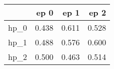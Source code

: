 \begin{tabular}{lrrr}
\toprule
{} &   ep 0 &   ep 1 &   ep 2 \\
\midrule
hp\_0 &  0.438 &  0.611 &  0.528 \\
hp\_1 &  0.488 &  0.576 &  0.600 \\
hp\_2 &  0.500 &  0.463 &  0.514 \\
\bottomrule
\end{tabular}
